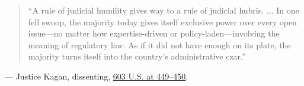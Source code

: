 \documentclass[12pt]{article}
\begin{document}
\begin{quote}
``A rule of judicial humility gives way to a rule of judicial hubris. ... In one fell swoop, the majority today gives itself exclusive power over every open issue---no matter how expertise-driven or policy-laden---involving the meaning of regulatory law. As if it did not have enough on its plate, the majority turns itself into the country's administrative czar.''
\end{quote}
\noindent --- Justice Kagan, dissenting, \href{https://www.law.cornell.edu/supremecourt/text/22-451}{603 U.S. at 449--450}.
\end{document}
